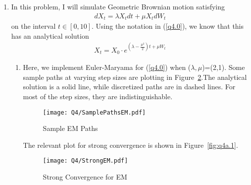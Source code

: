 \documentclass[12pt]{article}
\theoremstyle{plain}
\theoremstyle{definition}
\theoremstyle{remark}
\begin{document}
\begin{enumerate}
\begin{align*}
      \right)
      EX_n^2
    \end{align*}
    So then we have
    \begin{align*}
      \lim_{n\rightarrow\infty} EX_n^2 = 0
      \quad \Leftrightarrow \quad
      (1+\lambda\Delta t)^2 + \mu^2 \Delta t + \frac{\mu^4}{2}(\Delta t)^2
      < 1
    \end{align*}
    As in the EM case, let $y=\mu^2 \Delta t$ and $x=\lambda \Delta t$.
    This method then gives mean-square stability when
    \begin{align*}
      (1+x)^2 + y + \frac{1}{2} y^2 &< 1\\
      y + \frac{1}{2} y^2 &< 1- (1+x)^2 =1- (1+2x+x^2) \\
      y + \frac{1}{2} y^2 &< -x(2+x) \\
      1+2y + y^2 &< 1-2x(2+x) \\
      (1+y)^2 &< 1-2x(2+x) \\
      1+y &< \sqrt{1-2x(2+x)} \\
      y &< -1 + \sqrt{1-2x(2+x)}
    \end{align*}
    Figure~\ref{fig:q3} shows a sketch of the stability regions.
    \begin{figure}
      \caption{Stability Regions\label{fig:q3}}
      \texttt{[image: Regions.pdf]}
      \centering
    \end{figure}


  \clearpage
  \item %
    In this problem, I will simulate Geometric Brownian motion
    satisfying
    \begin{align}
      \label{q4.0}
      dX_t = \lambda X_t dt + \mu X_t dW_t
    \end{align}
    on the interval $t\in[0,10]$. Using the notation in (\ref{q4.0}), we
    know that this has an analytical solution
    \begin{align}
      X_t = X_0 \cdot e^{\left(\lambda-\frac{\mu^2}{2}\right) t + \mu W_t}
      \label{q4.1}
    \end{align}
    \begin{enumerate}
      \item %
        Here, we implement Euler-Maryama for (\ref{q4.0}) when
        ($\lambda, \mu$)=(2,1).  Some sample paths at varying step sizes
        are plotting in Figure~\ref{fig:q4a}.The analytical solution is
        a solid line, while discretized paths are in dashed lines. For
        most of the step sizes, they are indistinguishable.
        \begin{figure}[htpb!]
          \caption{Sample EM Paths\label{fig:q4a}}
          \texttt{[image: Q4/SamplePathsEM.pdf]}
          \centering
        \end{figure}
        The relevant plot for strong convergence is shown in
        Figure~\ref{fig:q4a.1}.
        \begin{figure}[htpb!]
          \caption{Strong Convergence for EM\label{fig:q4b}}
          \texttt{[image: Q4/StrongEM.pdf]}
          \centering
        \end{figure}


\end{enumerate}
\end{enumerate}
\end{document}
